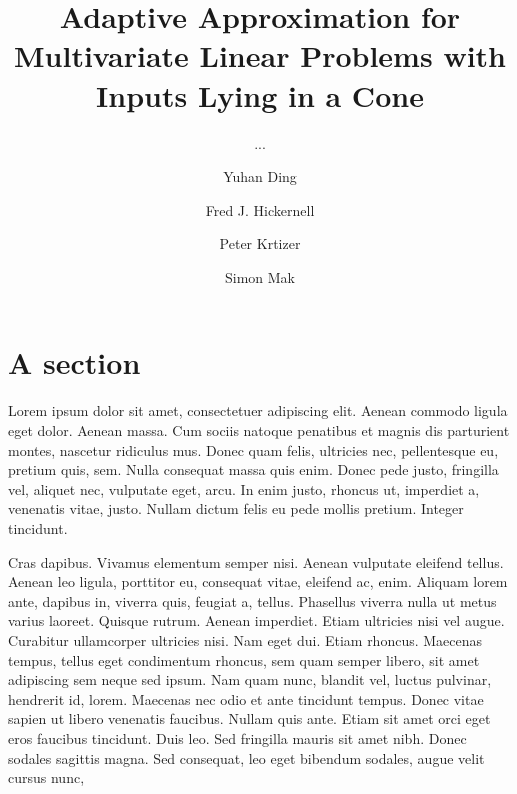 \documentclass[USenglish]{article}
\begin{document}

  \author[1]{Yuhan Ding}
  \author*[2]{Fred J. Hickernell}
  \author[3]{Peter Krtizer} 
  \author[4]{Simon Mak}
  \title{Adaptive Approximation for Multivariate Linear Problems with Inputs Lying in a Cone}
  \subtitle{...}
  \aop

\maketitle

\section{A section} 

Lorem ipsum dolor sit amet, consectetuer adipiscing elit. Aenean commodo ligula eget dolor. Aenean
  massa. Cum sociis natoque penatibus et magnis dis parturient montes, nascetur ridiculus mus. Donec
  quam felis, ultricies nec, pellentesque eu, pretium quis, sem. Nulla consequat massa quis
  enim. Donec pede justo, fringilla vel, aliquet nec, vulputate eget, arcu. In enim justo, rhoncus
  ut, imperdiet a, venenatis vitae, justo. Nullam dictum felis eu pede mollis pretium. Integer
  tincidunt.

  Cras dapibus. Vivamus elementum semper nisi. Aenean vulputate eleifend tellus. Aenean
  leo ligula, porttitor eu, consequat vitae, eleifend ac, enim. Aliquam lorem ante, dapibus in,
  viverra quis, feugiat a, tellus. Phasellus viverra nulla ut metus varius laoreet. Quisque
  rutrum. Aenean imperdiet. Etiam ultricies nisi vel augue. Curabitur ullamcorper ultricies
  nisi. Nam eget dui. Etiam rhoncus. Maecenas tempus, tellus eget condimentum rhoncus, sem quam
  semper libero, sit amet adipiscing sem neque sed ipsum. Nam quam nunc, blandit vel, luctus
  pulvinar, hendrerit id, lorem. Maecenas nec odio et ante tincidunt tempus. Donec vitae sapien ut
  libero venenatis faucibus. Nullam quis ante. Etiam sit amet orci eget eros faucibus
  tincidunt. Duis leo. Sed fringilla mauris sit amet nibh. Donec sodales sagittis magna. Sed
  consequat, leo eget bibendum sodales, augue velit cursus nunc,
\end{document}
